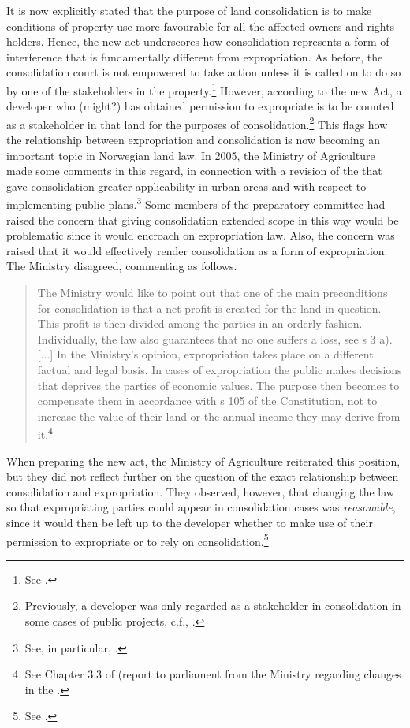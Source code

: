 {It is now explicitly stated that the purpose of land consolidation is to make conditions of property use more favourable for all the affected owners and rights holders. Hence, the new act underscores how consolidation represents a form of interference that is fundamentally different from expropriation. As before, the consolidation court is not empowered to take action unless it is called on to do so by one of the stakeholders in the property.\footnote{See \cite[1-5]{lca13}.} However, according to the new Act, a developer who (might?) has obtained permission to expropriate is to be counted as a stakeholder in that land for the purposes of consolidation.\footnote{Previously, a developer was only regarded as a stakeholder in consolidation in some cases of public projects, c.f., \cite[5|88|88 a)]{lca79}.} This flags how the relationship between expropriation and consolidation is now becoming an important topic in Norwegian land law.
}
In 2005, the Ministry of Agriculture made some comments in this regard, in connection with a revision of the \cite{lca79} that gave consolidation greater applicability in urban areas and with respect to implementing public plans.\footnote{See, in particular, \cite[2 h-i)]{lca79}.} Some members of the preparatory committee had raised the concern that giving consolidation extended scope in this way would be problematic since it would encroach on expropriation law. Also, the concern was raised that it would effectively render consolidation as a form of expropriation. The Ministry disagreed, commenting as follows.

\begin{quote}
The Ministry would like to point out that one of the main preconditions for consolidation is that a net profit is created for the land in question. This profit is then divided among the parties in an orderly fashion. Individually, the law also guarantees that no one suffers a loss, see s 3 a). [...] In the Ministry's opinion, expropriation takes place on a different factual and legal basis. In cases of expropriation the public makes decisions that deprives the parties of economic values. The purpose then becomes to compensate them in accordance with s 105 of the Constitution, not to increase the value of their land or the annual income they may derive from it.\footnote{See Chapter 3.3 of \cite{otprp78} (report to parliament from the Ministry regarding changes in the \cite{lca79}.}
\end{quote}

When preparing the new act, the Ministry of Agriculture reiterated this position, but they did not reflect further on the question of the exact relationship between consolidation and expropriation. They observed, however, that changing the law so that expropriating parties could appear in consolidation cases was \emph{reasonable}, since it would then be left up to the developer whether to make use of their permission to expropriate or to rely on consolidation.\footnote{See \cite[84]{prop12}.}

